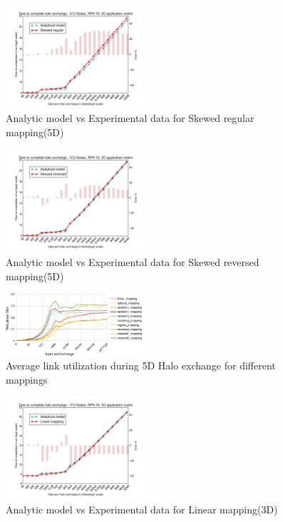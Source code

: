 \documentclass{acm_proc_article-sp}
\begin{document}
\begin{figure}
  \center
  \includegraphics[width=0.45\textwidth]{mappings/5d_skewed_regular.png}
  \caption{Analytic model vs Experimental data for Skewed regular mapping(5D)}
    \label{fig:5D_skewed_regular_mapping}
\end{figure}

\begin{figure}
  \center
  \includegraphics[width=0.45\textwidth]{mappings/5d_skewed_reversed.png}
  \caption{Analytic model vs Experimental data for Skewed reversed mapping(5D)}
    \label{fig:5D_skewed_reversed_mapping}
\end{figure}

\begin{figure}
  \center
  \includegraphics[width=0.45\textwidth]{fig/TEST_RPN_16_NODE_512_5D_LINK_UTIL}
  \caption{Average link utilization during 5D Halo exchange for different
          mappings
    \label{fig:TEST_RPN_16_NODE_512_5D_LINK_UTIL}}
\end{figure}

\clearpage
\begin{figure}
  \center
  \includegraphics[width=0.45\textwidth]{mappings/3d_linear.png}
  \caption{Analytic model vs Experimental data for Linear mapping(3D)}
    \label{fig:3D_linear_mapping}
\end{figure}
\end{document}
